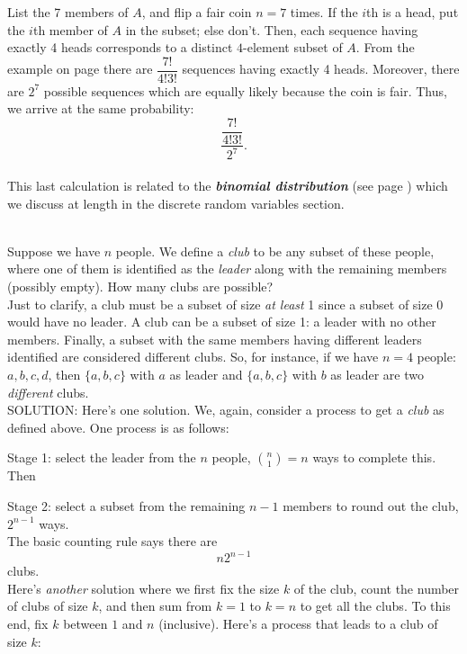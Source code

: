 \documentclass[12pt]{article}
\begin{document}
\noindent List the 7 members of $A$,
and flip a fair coin $n=7$ times. If the $i$th is a head, put the $i$th member of $A$ in the subset; else don't.
Then, each sequence having exactly 4 heads corresponds to
a distinct $4$-element subset of $A$.  From the example on page \pageref{7cointosses4heads}
there are $\dfrac {7!}{4!3!}$ sequences having exactly 4 heads.  Moreover, there are $2^7$ possible sequences which are equally likely because the coin is fair.
Thus, we arrive at the same probability: $$\dfrac {\dfrac{7!}{4!3!}}{2^7}.$$\\
This last calculation is related to the {\bf\em binomial distribution}\label{binomdist1} (see page \pageref{d:binomialnp}) which we discuss at length in the discrete random variables section.


\newpage


\\
Suppose we have $n$ people. We define a {\em club} to be any subset of
these people, where one of them is identified as the {\em leader} along with the remaining members (possibly empty).
How many clubs are possible?\\

\noindent Just to clarify, a club must be a subset of size {\em at least} 1 since a subset of size 0 would have no leader.
A club can be a subset of size 1: a leader with no other members. Finally, a subset with the same members having different leaders identified are considered different clubs.
So, for instance, if we have $n=4$ people: $a,b,c,d$, then $\{a,b,c\}$ with $a$ as leader and $\{a,b,c\}$ with $b$ as leader are two {\em different} clubs.\\

\noindent SOLUTION:  Here's one solution. We, again, consider a process to get a {\em club} as defined above.  One process is as follows:

Stage 1: select the leader from the $n$ people, ${n\choose 1}=n$ ways to complete this. Then

Stage 2: select a subset from the remaining $n-1$ members to round out the club, $2^{n-1}$ ways.\\
\noindent The basic counting rule says there are
\begin{equation}n2^{n-1}\label{eq:clubcount1}\end{equation}
clubs.\\

\noindent Here's {\em another} solution where we first fix the size $k$ of the club, count the number of clubs of size $k$, and then sum from $k=1$ to $k=n$ to get all the clubs.
To this end, fix $k$ between $1$ and $n$ (inclusive). Here's a process that leads to a club of size $k$:
\end{document}
